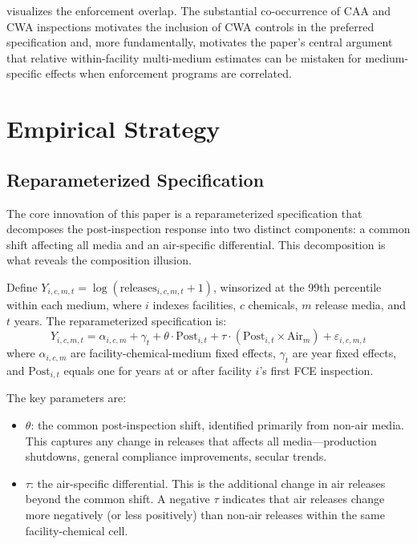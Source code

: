\documentclass[12pt]{article}
\begin{document}
 visualizes the enforcement overlap. The substantial co-occurrence of CAA and CWA inspections motivates the inclusion of CWA controls in the preferred specification and, more fundamentally, motivates the paper's central argument that relative within-facility multi-medium estimates can be mistaken for medium-specific effects when enforcement programs are correlated.


\section{Empirical Strategy}
\label{sec:strategy}

\subsection{Reparameterized Specification}

The core innovation of this paper is a reparameterized specification that decomposes the post-inspection response into two distinct components: a common shift affecting all media and an air-specific differential. This decomposition is what reveals the composition illusion.

Define $Y_{i,c,m,t} = \log(\text{releases}_{i,c,m,t} + 1)$, winsorized at the 99th percentile within each medium, where $i$ indexes facilities, $c$ chemicals, $m$ release media, and $t$ years. The reparameterized specification is:
\begin{equation}
\label{eq:reparam}
Y_{i,c,m,t} = \alpha_{i,c,m} + \gamma_t + \theta \cdot \text{Post}_{i,t} + \tau \cdot (\text{Post}_{i,t} \times \text{Air}_m) + \varepsilon_{i,c,m,t}
\end{equation}
where $\alpha_{i,c,m}$ are facility-chemical-medium fixed effects, $\gamma_t$ are year fixed effects, and $\text{Post}_{i,t}$ equals one for years at or after facility $i$'s first FCE inspection.

The key parameters are:
\begin{itemize}
\item $\theta$: the common post-inspection shift, identified primarily from non-air media. This captures any change in releases that affects all media---production shutdowns, general compliance improvements, secular trends.
\item $\tau$: the air-specific differential. This is the additional change in air releases beyond the common shift. A negative $\tau$ indicates that air releases change more negatively (or less positively) than non-air releases within the same facility-chemical cell.
\end{itemize}
\end{document}
